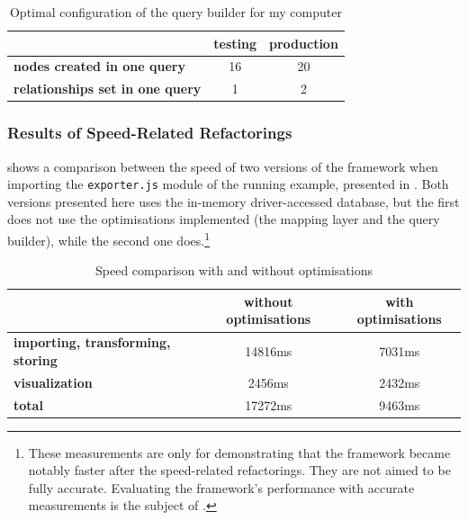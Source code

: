 \begin{table}[!htb]
	\centering
	\begin{tabular}{l|cc}
		\toprule
																								&   \textbf{testing}   &   \textbf{production}   \\
		\midrule
		\textbf{nodes created in one query}         &   16                 &   20                    \\
		\textbf{relationships set in one query}     &   1                  &   2                     \\
		\bottomrule
	\end{tabular}

	\caption{Optimal configuration of the query builder for my computer}
	\label{table:query-builder-config}
\end{table}


\subsubsection{Results of Speed-Related Refactorings}

 shows a comparison between the speed of two versions of the framework when importing the \texttt{exporter.js} module of the running example, presented in . Both versions presented here uses the in-memory driver-accessed database, but the first does not use the optimisations implemented (the mapping layer and the query builder), while the second one does.\footnote{These measurements are only for demonstrating that the framework became notably faster after the speed-related refactorings. They are not aimed to be fully accurate. Evaluating the framework's performance with accurate measurements is the subject of .}

\begin{table}[!htb]
	\centering
	\begin{tabular}{l|cc}
		\toprule
																								&   \textbf{without optimisations}   &   \textbf{with optimisations}   \\
		\midrule
		\textbf{importing, transforming, storing}   &   14816ms                          &   7031ms                        \\
		\textbf{visualization}                      &   2456ms                           &   2432ms                        \\
		\midrule
		\textbf{total}                              &   17272ms                          &   9463ms                        \\
		\bottomrule
	\end{tabular}

	\caption{Speed comparison with and without optimisations}
	\label{table:results-of-query-optimisations}
\end{table}


